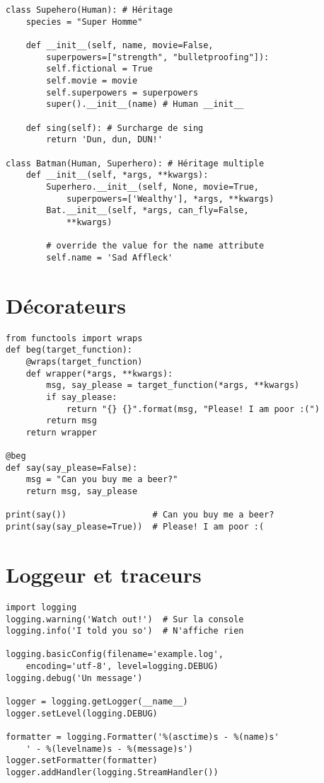 \documentclass{article}
\begin{document}
\begin{multicols*}{4}
\begin{lstlisting}
class Supehero(Human): # Héritage
    species = "Super Homme"

    def __init__(self, name, movie=False,
        superpowers=["strength", "bulletproofing"]):
        self.fictional = True
        self.movie = movie
        self.superpowers = superpowers
        super().__init__(name) # Human __init__

    def sing(self): # Surcharge de sing
        return 'Dun, dun, DUN!'

class Batman(Human, Superhero): # Héritage multiple
    def __init__(self, *args, **kwargs):
        Superhero.__init__(self, None, movie=True,
            superpowers=['Wealthy'], *args, **kwargs)
        Bat.__init__(self, *args, can_fly=False,
            **kwargs)

        # override the value for the name attribute
        self.name = 'Sad Affleck'
\end{lstlisting}

\section*{Décorateurs}
\begin{lstlisting}
from functools import wraps
def beg(target_function):
    @wraps(target_function)
    def wrapper(*args, **kwargs):
        msg, say_please = target_function(*args, **kwargs)
        if say_please:
            return "{} {}".format(msg, "Please! I am poor :(")
        return msg
    return wrapper

@beg
def say(say_please=False):
    msg = "Can you buy me a beer?"
    return msg, say_please

print(say())                 # Can you buy me a beer?
print(say(say_please=True))  # Please! I am poor :(
\end{lstlisting}

\section*{Loggeur et traceurs}
\begin{lstlisting}
import logging
logging.warning('Watch out!')  # Sur la console
logging.info('I told you so')  # N'affiche rien

logging.basicConfig(filename='example.log',
    encoding='utf-8', level=logging.DEBUG)
logging.debug('Un message')

logger = logging.getLogger(__name__)
logger.setLevel(logging.DEBUG)

formatter = logging.Formatter('%(asctime)s - %(name)s'
    ' - %(levelname)s - %(message)s')
logger.setFormatter(formatter)
logger.addHandler(logging.StreamHandler())


\end{lstlisting}
\end{multicols*}
\end{document}
